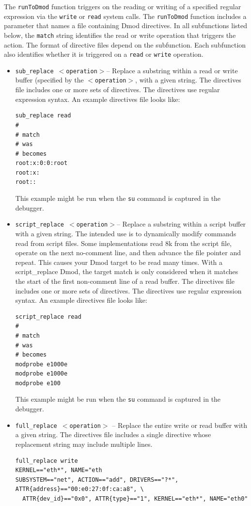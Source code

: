 \documentclass[titlepage]{article}
\begin{document}
The {\tt runToDmod} function triggers on the reading or writing of a specified
regular expression via the {\tt write} or {\tt read} system calls.  
The {\tt runToDmod} function includes a parameter that names a file containing
Dmod directives.  In all subfunctions listed
below, the {\tt match} string identifies the read or write operation that triggers the action. 
The format of directive files depend on the subfunction.  Each subfunction also identifies whether it is
triggered on a {\tt read} or {\tt write} operation. 
 
\begin{itemize}
\item {\tt sub\_replace $<$operation$>$}-- Replace a substring within a read or write buffer (specified by the
{\tt $<$operation$>$}, with a given string.
The directives file includes one or more sets of directives.
The directives use regular expression syntax.
An example directives file looks like:
\begin{verbatim}
sub_replace read
#
# match
# was
# becomes
root:x:0:0:root
root:x:
root::
\end{verbatim}
\noindent This example might be run when the {\tt su} command is captured in the debugger.

\item {\tt script\_replace $<$operation$>$}-- Replace a substring within a script buffer with a given string.
The intended use is to dynamically modify commands read from script files. Some implementations read 8k
from the script file, operate on the next no-comment line, and then advance the file pointer and repeat.  This causes your Dmod target to be read
many times.  With a script\_replace Dmod, the target match is only considered when it matches the start
of the first non-comment line of a read buffer. 
The directives file includes one or more sets of directives.
The directives use regular expression syntax.
An example directives file looks like:
\begin{verbatim}
script_replace read
#
# match
# was
# becomes
modprobe e1000e
modprobe e1000e
modprobe e100
\end{verbatim}
\noindent This example might be run when the {\tt su} command is captured in the debugger.

\item {\tt full\_replace $<$operation$>$} -- Replace the entire write or read buffer with a given string.
The directives file includes a single directive whose replacement string may include multiple lines.
\begin{verbatim}
full_replace write
KERNEL=="eth*", NAME="eth
SUBSYSTEM=="net", ACTION=="add", DRIVERS=="?*", ATTR{address}=="00:e0:27:0f:ca:a8", \
  ATTR{dev_id}=="0x0", ATTR{type}=="1", KERNEL=="eth*", NAME="eth0"


\end{verbatim}
\end{itemize}
\end{document}
